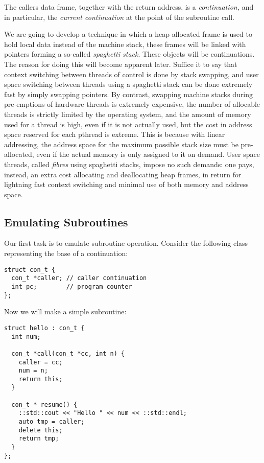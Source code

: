 \documentclass[oneside]{book}
\begin{document}
The callers data frame, together with the return address, is a {\em continuation,}
and in particular, the {\em current continuation} at the point of the subroutine 
call.

We are going to develop a technique in which a heap allocated frame is
used to hold local data instead of the machine stack, these frames
will be linked with pointers forming a so-called {\em spaghetti stack}.
These objects will be continuations. The reason for doing this will
become apparent later. Suffice it to say that context switching
between threads of control is done by stack swapping, and user space
switching between threads using a spaghetti stack can be done extremely
fast by simply swapping pointers. By contrast, swapping machine stacks
during pre-emptions of hardware threads is extremely expensive, the
number of allocable threads is strictly limited by the operating system,
and the amount of memory used for a thread is high, even if it
is not actually used, but the cost in address space reserved for each pthread
is extreme. This is because with linear addressing, the address space for
the maximum possible stack size must be pre-allocated, even if the actual
memory is only assigned to it on demand. User space threads, called {\em fibres}
using spaghetti stacks, impose no such demands: one pays, instead, an extra 
cost allocating and deallocating heap frames, in return for lightning fast
context switching and minimal use of both memory and address space.

\subsection{Emulating Subroutines}
Our first task is to emulate subroutine operation.
Consider the following class representing the base
of a continuation:

\begin{verbatim}
struct con_t {
  con_t *caller; // caller continuation
  int pc;        // program counter
};
\end{verbatim}

Now we will make a simple subroutine:

\begin{verbatim}
struct hello : con_t {
  int num;

  con_t *call(con_t *cc, int n) { 
    caller = cc;
    num = n; 
    return this;
  }

  con_t * resume() {
    ::std::cout << "Hello " << num << ::std::endl;
    auto tmp = caller;
    delete this; 
    return tmp; 
  }
};
\end{verbatim}
\end{document}
